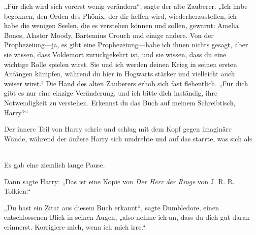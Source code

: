 „Für dich wird sich vorerst wenig verändern“, sagte der alte Zauberer. „Ich habe begonnen, den Orden des Phönix, der dir helfen wird, wiederherzustellen, ich habe die wenigen Seelen, die es verstehen können und sollen, gewarnt: Amelia Bones, Alastor Moody, Bartemius Crouch und einige andere. Von der Prophezeiung—ja, es gibt eine Prophezeiung—habe ich ihnen nichts gesagt, aber sie wissen, dass Voldemort zurückgekehrt ist, und sie wissen, dass du eine wichtige Rolle spielen wirst. Sie und ich werden deinen Krieg in seinen ersten Anfängen kämpfen, während du hier in Hogwarts stärker und vielleicht auch weiser wirst.“ Die Hand des alten Zauberers erhob sich fast flehentlich. „Für dich gibt es nur eine einzige Veränderung, und ich bitte dich inständig, ihre Notwendigkeit zu verstehen. Erkennst du das Buch auf meinem Schreibtisch, Harry?“

Der innere Teil von Harry schrie und schlug mit dem Kopf gegen imaginäre Wände, während der äußere Harry sich umdrehte und auf das starrte, was sich als—

Es gab eine ziemlich lange Pause.

Dann sagte Harry: „Das ist eine Kopie von \emph{Der Herr der Ringe} von J. R. R. Tolkien.“

„Du hast ein Zitat aus diesem Buch erkannt“, sagte Dumbledore, einen entschlossenen Blick in seinen Augen, „also nehme ich an, dass du dich gut daran erinnerst. Korrigiere mich, wenn ich mich irre.“

